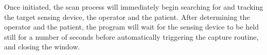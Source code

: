 Once initiated, the scan process will immediately begin searching for and tracking the target sensing device, the operator and the patient. After determining the operator and the patient, the program will wait for the sensing device to be held still for a number of seconds before automatically triggering the capture routine, and closing the window.\\
